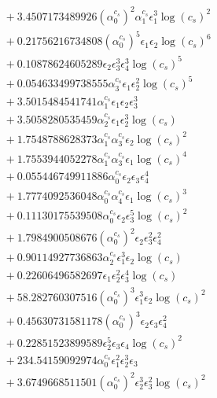 \documentclass[10pt]{article}
\begin{document}
\begin{align*}
&{}  + 3.4507173489926 \left(\alpha_{0}^{c_s}\right)^{2} \alpha_{1}^{c_s} \epsilon_{1}^{3} \log{\left(c_{s} \right)}^{2} \\
&{}  + 0.21756216734808 \left(\alpha_{0}^{c_s}\right)^{5} \epsilon_{1} \epsilon_{2} \log{\left(c_{s} \right)}^{6} \\
&{}  + 0.10878624605289 \epsilon_{2} \epsilon_{3}^{3} \epsilon_{4}^{3} \log{\left(c_{s} \right)}^{5} \\
&{}  + 0.054633499738555 \alpha_{3}^{c_s} \epsilon_{1} \epsilon_{2}^{2} \log{\left(c_{s} \right)}^{5} \\
&{}  + 3.5015484541741 \alpha_{1}^{c_s} \epsilon_{1} \epsilon_{2} \epsilon_{3}^{3} \\
&{}  + 3.5058280535459 \alpha_{2}^{c_s} \epsilon_{1} \epsilon_{2}^{3} \log{\left(c_{s} \right)} \\
&{}  + 1.7548788628373 \alpha_{1}^{c_s} \alpha_{3}^{c_s} \epsilon_{2} \log{\left(c_{s} \right)}^{2} \\
&{}  + 1.7553944052278 \alpha_{1}^{c_s} \alpha_{3}^{c_s} \epsilon_{1} \log{\left(c_{s} \right)}^{4} \\
&{}  + 0.055446749911886 \alpha_{0}^{c_s} \epsilon_{2} \epsilon_{3} \epsilon_{4}^{4} \\
&{}  + 1.7774092536048 \alpha_{0}^{c_s} \alpha_{4}^{c_s} \epsilon_{1} \log{\left(c_{s} \right)}^{3} \\
&{}  + 0.11130175539508 \alpha_{0}^{c_s} \epsilon_{2} \epsilon_{3}^{5} \log{\left(c_{s} \right)}^{2} \\
&{}  + 1.7984900508676 \left(\alpha_{0}^{c_s}\right)^{2} \epsilon_{2} \epsilon_{3}^{2} \epsilon_{4}^{2} \\
&{}  + 0.90114927736863 \alpha_{2}^{c_s} \epsilon_{1}^{3} \epsilon_{2} \log{\left(c_{s} \right)} \\
&{}  + 0.22606496582697 \epsilon_{1} \epsilon_{2}^{2} \epsilon_{3}^{4} \log{\left(c_{s} \right)} \\
&{}  + 58.282760307516 \left(\alpha_{0}^{c_s}\right)^{3} \epsilon_{1}^{3} \epsilon_{2} \log{\left(c_{s} \right)}^{2} \\
&{}  + 0.45630731581178 \left(\alpha_{0}^{c_s}\right)^{3} \epsilon_{2} \epsilon_{3} \epsilon_{4}^{2} \\
&{}  + 0.22851523899589 \epsilon_{2}^{5} \epsilon_{3} \epsilon_{4} \log{\left(c_{s} \right)}^{2} \\
&{}  + 234.54159092974 \alpha_{0}^{c_s} \epsilon_{1}^{2} \epsilon_{2}^{3} \epsilon_{3} \\
&{}  + 3.6749668511501 \left(\alpha_{0}^{c_s}\right)^{2} \epsilon_{2}^{3} \epsilon_{3}^{2} \log{\left(c_{s} \right)}^{2} \\

\end{align*}
\end{document}

